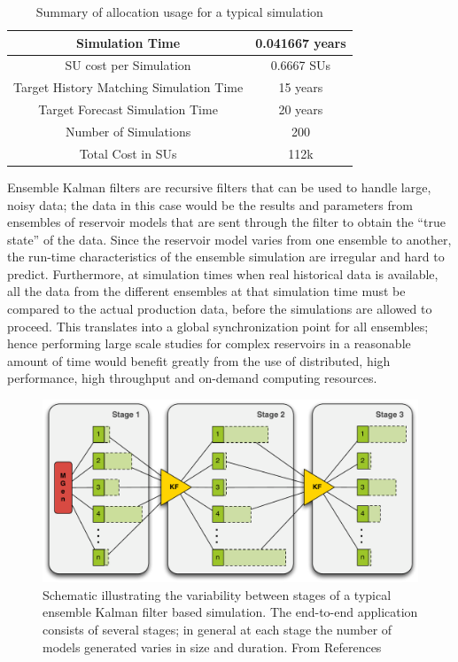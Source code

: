 \documentclass[a4paper,10pt]{article}
\begin{document}
\begin{table}[!h]
\begin{center}
 \caption{Summary of allocation usage for a typical simulation}
\begin{tabular}{| c | c |}
\hline
Simulation Time & 0.041667 years \\ 
\hline
SU cost per Simulation & 0.6667 SUs \\ 
\hline
Target History Matching Simulation Time & 15 years \\ 
\hline
Target Forecast Simulation Time & 20 years \\ 
\hline
Number of Simulations & 200 \\ 
\hline
Total Cost in SUs & 112k\\
\hline
\end{tabular}
\end{center}
\end{table}

Ensemble Kalman filters are recursive filters that can be used to handle large, noisy data; the data in this case would be the results and parameters from ensembles of reservoir models that are sent through the filter to obtain the ``true state'' of the data. Since the reservoir model varies from one ensemble to another, the run-time characteristics of the ensemble simulation are irregular and hard to predict. Furthermore, at simulation times when real historical data is available, all the data from the different ensembles at that simulation time must be compared to the actual production data, before the simulations are allowed to proceed. This translates into a global synchronization point for all ensembles; hence performing large scale studies for complex reservoirs in a reasonable amount of time would benefit greatly from the use of distributed, high performance, high throughput and on-demand computing resources.

\begin{figure}
\begin{center}
\includegraphics*[scale=0.4,angle=0]{3StageKalmanFilter}
\end{center}
\caption{Schematic illustrating the variability between stages of a typical
  ensemble Kalman filter based simulation. The end-to-end
  application consists of several stages; in general at each stage the
  number of models generated varies in size and duration. From References~\cite{teragrid08, gmac}}
\label{fig:irregular_execution}
\end{figure}
\end{document}
